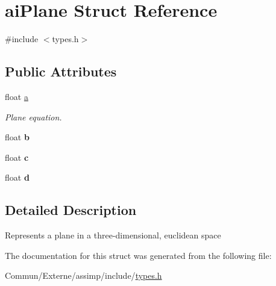 \hypertarget{structai_plane}{}\section{ai\+Plane Struct Reference}
\label{structai_plane}


{\ttfamily \#include $<$types.\+h$>$}

\subsection*{Public Attributes}
\begin{DoxyCompactItemize}
\item 
float \hyperlink{structai_plane_aeadf64e70e6daf1f7f431c90cfc8bce1}{a}\hypertarget{structai_plane_aeadf64e70e6daf1f7f431c90cfc8bce1}{}\label{structai_plane_aeadf64e70e6daf1f7f431c90cfc8bce1}

\begin{DoxyCompactList}\small\item\em Plane equation. \end{DoxyCompactList}\item 
float {\bfseries b}\hypertarget{structai_plane_a84ab33cd9b2f5325282b489f8a2bf11c}{}\label{structai_plane_a84ab33cd9b2f5325282b489f8a2bf11c}

\item 
float {\bfseries c}\hypertarget{structai_plane_a7b0ea36c355ca003a5789088fb24da1f}{}\label{structai_plane_a7b0ea36c355ca003a5789088fb24da1f}

\item 
float {\bfseries d}\hypertarget{structai_plane_ab8696b583b6fab46ae30cd5b691e7c9a}{}\label{structai_plane_ab8696b583b6fab46ae30cd5b691e7c9a}

\end{DoxyCompactItemize}


\subsection{Detailed Description}
Represents a plane in a three-\/dimensional, euclidean space 

The documentation for this struct was generated from the following file\+:\begin{DoxyCompactItemize}
\item 
Commun/\+Externe/assimp/include/\hyperlink{types_8h}{types.\+h}\end{DoxyCompactItemize}
